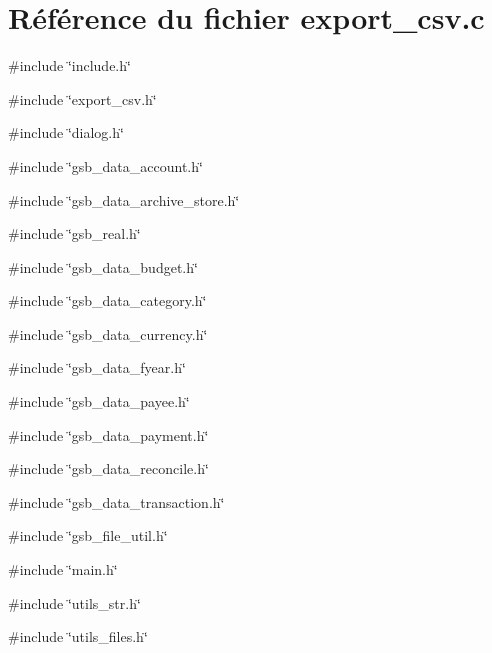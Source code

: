 \section{Référence du fichier export\_\-csv.c}
\label{export__csv_8c}
{\ttfamily \#include \char`\"{}include.h\char`\"{}}\par
{\ttfamily \#include \char`\"{}export\_\-csv.h\char`\"{}}\par
{\ttfamily \#include \char`\"{}dialog.h\char`\"{}}\par
{\ttfamily \#include \char`\"{}gsb\_\-data\_\-account.h\char`\"{}}\par
{\ttfamily \#include \char`\"{}gsb\_\-data\_\-archive\_\-store.h\char`\"{}}\par
{\ttfamily \#include \char`\"{}gsb\_\-real.h\char`\"{}}\par
{\ttfamily \#include \char`\"{}gsb\_\-data\_\-budget.h\char`\"{}}\par
{\ttfamily \#include \char`\"{}gsb\_\-data\_\-category.h\char`\"{}}\par
{\ttfamily \#include \char`\"{}gsb\_\-data\_\-currency.h\char`\"{}}\par
{\ttfamily \#include \char`\"{}gsb\_\-data\_\-fyear.h\char`\"{}}\par
{\ttfamily \#include \char`\"{}gsb\_\-data\_\-payee.h\char`\"{}}\par
{\ttfamily \#include \char`\"{}gsb\_\-data\_\-payment.h\char`\"{}}\par
{\ttfamily \#include \char`\"{}gsb\_\-data\_\-reconcile.h\char`\"{}}\par
{\ttfamily \#include \char`\"{}gsb\_\-data\_\-transaction.h\char`\"{}}\par
{\ttfamily \#include \char`\"{}gsb\_\-file\_\-util.h\char`\"{}}\par
{\ttfamily \#include \char`\"{}main.h\char`\"{}}\par
{\ttfamily \#include \char`\"{}utils\_\-str.h\char`\"{}}\par
{\ttfamily \#include \char`\"{}utils\_\-files.h\char`\"{}}\par
